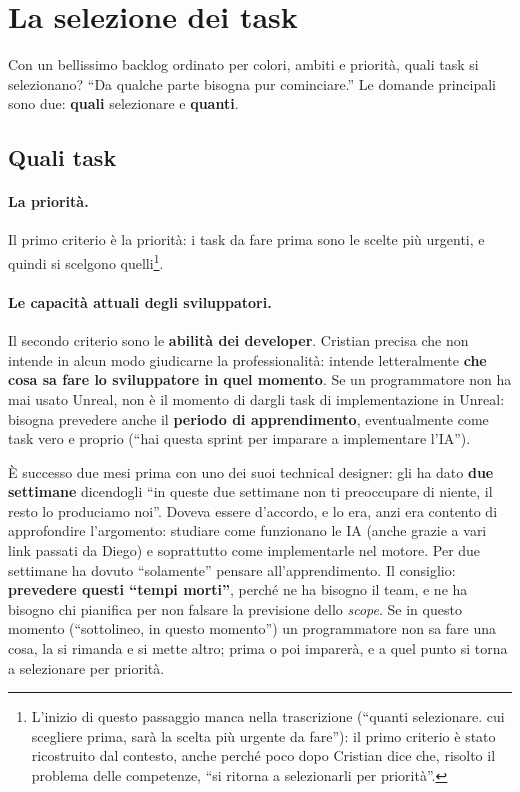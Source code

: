 \section{La selezione dei task}
\label{sec:z3-selezione}

Con un bellissimo backlog ordinato per colori, ambiti e priorità, quali task
si selezionano? ``Da qualche parte bisogna pur cominciare.'' Le domande
principali sono due: \textbf{quali} selezionare e \textbf{quanti}.

\subsection{Quali task}

\paragraph{La priorità.} Il primo criterio è la priorità: i task da fare
prima sono le scelte più urgenti, e quindi si scelgono quelli\footnote{L'inizio
di questo passaggio manca nella trascrizione (``quanti selezionare. cui
scegliere prima, sarà la scelta più urgente da fare''): il primo criterio è
stato ricostruito dal contesto, anche perché poco dopo Cristian dice che,
risolto il problema delle competenze, ``si ritorna a selezionarli per
priorità''.}.

\paragraph{Le capacità attuali degli sviluppatori.} Il secondo criterio sono
le \textbf{abilità dei developer}. Cristian precisa che non intende in alcun
modo giudicarne la professionalità: intende letteralmente \textbf{che cosa sa
fare lo sviluppatore in quel momento}. Se un programmatore non ha mai usato
Unreal, non è il momento di dargli task di implementazione in Unreal: bisogna
prevedere anche il \textbf{periodo di apprendimento}, eventualmente come task
vero e proprio (``hai questa sprint per imparare a implementare l'IA'').

È successo due mesi prima con uno dei suoi technical designer: gli ha dato
\textbf{due settimane} dicendogli ``in queste due settimane non ti preoccupare
di niente, il resto lo produciamo noi''. Doveva essere d'accordo, e lo era,
anzi era contento di approfondire l'argomento: studiare come funzionano le IA
(anche grazie a vari link passati da Diego) e soprattutto come implementarle
nel motore. Per due settimane ha dovuto ``solamente'' pensare
all'apprendimento. Il consiglio: \textbf{prevedere questi ``tempi morti''},
perché ne ha bisogno il team, e ne ha bisogno chi pianifica per non falsare la
previsione dello \emph{scope}. Se in questo momento (``sottolineo, in questo
momento'') un programmatore non sa fare una cosa, la si rimanda e si mette
altro; prima o poi imparerà, e a quel punto si torna a selezionare per
priorità.

